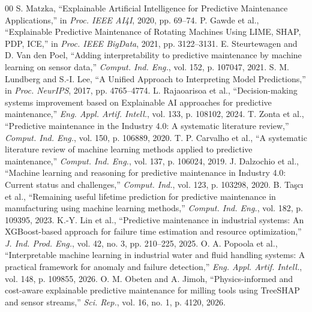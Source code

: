 \documentclass[journal,10pt,twocolumn]{IEEEtran}
\begin{document}
\begin{thebibliography}{00}
 S. Matzka, ``Explainable Artificial Intelligence for Predictive Maintenance Applications,'' in \emph{Proc. IEEE AI4I}, 2020, pp. 69--74.
 P. Gawde et al., ``Explainable Predictive Maintenance of Rotating Machines Using LIME, SHAP, PDP, ICE,'' in \emph{Proc. IEEE BigData}, 2021, pp. 3122--3131.
 E. Steurtewagen and D. Van den Poel, ``Adding interpretability to predictive maintenance by machine learning on sensor data,'' \emph{Comput. Ind. Eng.}, vol. 152, p. 107047, 2021.
 S. M. Lundberg and S.-I. Lee, ``A Unified Approach to Interpreting Model Predictions,'' in \emph{Proc. NeurIPS}, 2017, pp. 4765--4774.
 L. Rajaoarisoa et al., ``Decision-making systems improvement based on Explainable AI approaches for predictive maintenance,'' \emph{Eng. Appl. Artif. Intell.}, vol. 133, p. 108102, 2024.
 T. Zonta et al., ``Predictive maintenance in the Industry 4.0: A systematic literature review,'' \emph{Comput. Ind. Eng.}, vol. 150, p. 106889, 2020.
 T. P. Carvalho et al., ``A systematic literature review of machine learning methods applied to predictive maintenance,'' \emph{Comput. Ind. Eng.}, vol. 137, p. 106024, 2019.
 J. Dalzochio et al., ``Machine learning and reasoning for predictive maintenance in Industry 4.0: Current status and challenges,'' \emph{Comput. Ind.}, vol. 123, p. 103298, 2020.
 B. Taşcı et al., ``Remaining useful lifetime prediction for predictive maintenance in manufacturing using machine learning methods,'' \emph{Comput. Ind. Eng.}, vol. 182, p. 109395, 2023.
 K.-Y. Lin et al., ``Predictive maintenance in industrial systems: An XGBoost-based approach for failure time estimation and resource optimization,'' \emph{J. Ind. Prod. Eng.}, vol. 42, no. 3, pp. 210--225, 2025.
 O. A. Popoola et al., ``Interpretable machine learning in industrial water and fluid handling systems: A practical framework for anomaly and failure detection,'' \emph{Eng. Appl. Artif. Intell.}, vol. 148, p. 109855, 2026.
 O. M. Obeten and A. Jimoh, ``Physics-informed and cost-aware explainable predictive maintenance for milling tools using TreeSHAP and sensor streams,'' \emph{Sci. Rep.}, vol. 16, no. 1, p. 4120, 2026.
\end{thebibliography}
\end{document}
